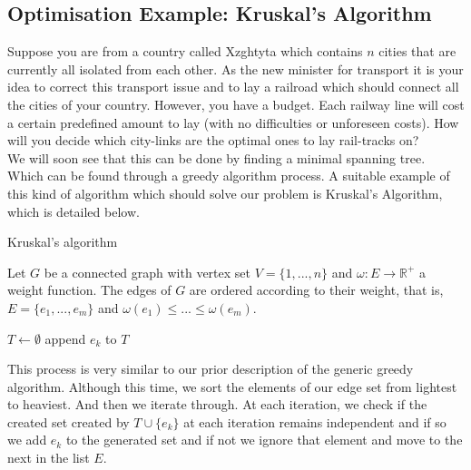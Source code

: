 \documentclass[../main.tex]{subfiles}
\begin{document}
\subsection{Optimisation Example: Kruskal's Algorithm}
\begin{exmp}
Suppose you are from a country called Xzghtyta which contains $n$ cities that are currently all isolated from each other.  As the new minister for transport it is your idea to correct this transport issue and to lay a railroad which should connect all the cities of your country. However, you have a budget. Each railway line will cost a certain predefined amount to lay (with no difficulties or unforeseen costs). How will you decide which city-links are the optimal ones to lay rail-tracks on?\\
\indent We will soon see that this can be done  by finding a minimal spanning tree. Which can be found through a greedy algorithm process. A suitable example of this kind of algorithm which should solve our problem is Kruskal's Algorithm\cite{kruskal}, which is detailed below.
\end{exmp}

\begin{algorithm}[H]
\caption{Kruskal's algorithm}\label{kruskal}
Let $G$ be a connected graph with vertex set $V = \{1,...,n\}$ and $\omega:E \longrightarrow \mathbb{R^+}$ a weight function. The edges of $G$ are ordered according to their weight, that is, $E = \{e_1,...,e_m\}$ and $\omega(e_1) \leq ... \leq \omega(e_m).$
\begin{algorithmic}[1]
\State $T\gets \emptyset$
	 	\State append $e_k$ to $T$
	\EndIf
\EndFor
\EndProcedure
\end{algorithmic}
\end{algorithm}

This process is very similar to our prior description of the generic greedy algorithm. Although this time, we sort the elements of our edge set from lightest to heaviest. And then we iterate through. At each iteration, we check if the created set created by $T \cup \{e_k\}$ at each iteration remains independent and if so we add $e_k$ to the generated set and if not we ignore that element and move to the next in the list $E.$
\end{document}
